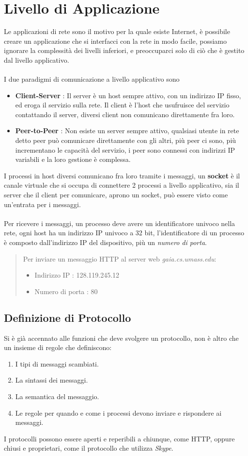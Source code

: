 \documentclass[12pt, letterpaper]{article}
\newcommand{\acc}{\\\hphantom{}\\}
\begin{document}
\section{Livello di Applicazione}
Le applicazioni di rete sono il motivo per la quale esiste Internet, è possibile creare un applicazione
che si interfacci con la rete in modo facile, possiamo ignorare la complessità dei livelli inferiori,
e preoccuparci solo di ciò che è gestito dal livello applicativo.\acc
I due paradigmi di comunicazione a livello applicativo sono \begin{itemize}
    \item \textbf{Client-Server} : Il server è un host sempre attivo, con un indirizzo IP fisso, ed eroga il
          servizio sulla rete. Il client è l'host che usufruisce del servizio contattando il server, diversi client
          non comunicano direttamente fra loro.
    \item \textbf{Peer-to-Peer} : Non esiste un server sempre attivo, qualsiasi utente in rete detto peer può
          comunicare direttamente con gli altri, più peer ci sono, più incrementano le capacità del servizio, i
          peer sono connessi con indirizzi IP variabili e la loro gestione è complessa.
\end{itemize}
I processi in host diversi comunicano fra loro tramite i messaggi, un \textbf{socket} è il canale
virtuale che si occupa di connettere 2 processi a livello applicativo, sia il server che il client per
comunicare, aprono un socket, può essere visto come un'entrata per i messaggi.\acc
Per ricevere i messaggi, un processo deve avere un identificatore univoco nella rete, ogni host ha un
indirizzo IP univoco a 32 bit, l'identificatore di un processo è composto dall'indirizzo IP
del dispositivo, più un \textit{numero di porta}.\begin{quote}
    Per inviare un messaggio HTTP al server web \textit{gaia.cs.umass.edu}:\begin{itemize}
        \item Indirizzo IP : 128.119.245.12
        \item Numero di porta : 80
    \end{itemize}
\end{quote}
\subsection{Definizione di Protocollo}
Si è già accennato alle funzioni che deve svolgere un protocollo, non è altro che un insieme di regole
che definiscono:\begin{enumerate}
    \item I tipi di messaggi scambiati.
    \item La sintassi dei messaggi.
    \item La semantica del messaggio.
    \item Le regole per quando e come i processi devono inviare e rispondere ai messaggi.
\end{enumerate}
I protocolli possono essere aperti e reperibili a chiunque, come HTTP, oppure chiusi e proprietari, come
il protocollo che utilizza \textit{Skype}.
\end{document}
